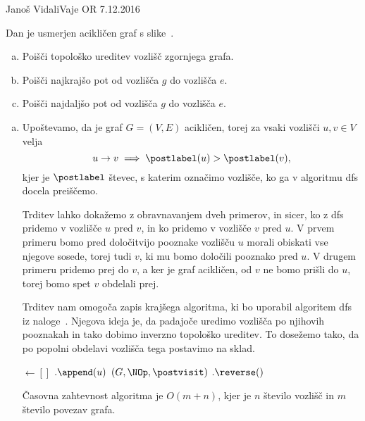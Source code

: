 \begin{naloga}{Janoš Vidali}{Vaje OR 7.12.2016}
\begin{vprasanje}
Dan je usmerjen acikličen graf s slike~\fig.

\begin{enumerate}[(a)]
\item Poišči topološko ureditev vozlišč zgornjega grafa.

\item Poišči najkrajšo pot od vozlišča $g$ do vozlišča $e$.

\item Poišči najdaljšo pot od vozlišča $g$ do vozlišča $e$.
\end{enumerate}

\begin{slika}
\pgfslika
{}
\end{slika}
\end{vprasanje}
\begin{odgovor}

\begin{enumerate}[(a)]
\item Upoštevamo, da je graf $G = (V, E)$ acikličen,
torej za vsaki vozlišči $u, v \in V$ velja
$$
u \rightarrow v \implies \postlabel(u) > \postlabel(v),
$$
kjer je $\postlabel$ števec, s katerim označimo vozlišče,
ko ga v algoritmu {\sc dfs} docela preiščemo.

Trditev lahko dokažemo z obravnavanjem dveh primerov, in sicer, 
ko z {\sc dfs} pridemo v vozlišče $u$ pred $v$,
in ko pridemo v vozlišče $v$ pred $u$.
V prvem primeru bomo pred določitvijo pooznake vozlišču $u$
morali obiskati vse njegove sosede,
torej tudi $v$, ki mu bomo določili pooznako pred $u$.
V drugem primeru pridemo prej do $v$,
a ker je graf acikličen, od $v$ ne bomo prišli do $u$,
torej bomo spet $v$ obdelali prej.

Trditev nam omogoča zapis krajšega algoritma,
ki bo uporabil algoritem {\sc dfs} iz naloge~\nal[dfs].
Njegova ideja je, da padajoče uredimo vozlišča po njihovih pooznakah
in tako dobimo inverzno topološko ureditev.
To dosežemo tako, da po popolni obdelavi vozlišča tega postavimo na sklad.
\begin{small}
\begin{algorithmic}
	 $\gets []$
		$.\append(u)$
	\EndFunction
	$(G, \NOp, \postvisit)$
	$.\reverse()$
	\State {}
\EndFunction
\end{algorithmic}
\end{small}
Časovna zahtevnost algoritma je $O(m + n)$,
kjer je $n$ število vozlišč in $m$ število povezav grafa.


\end{enumerate}
\end{odgovor}
\end{naloga}
